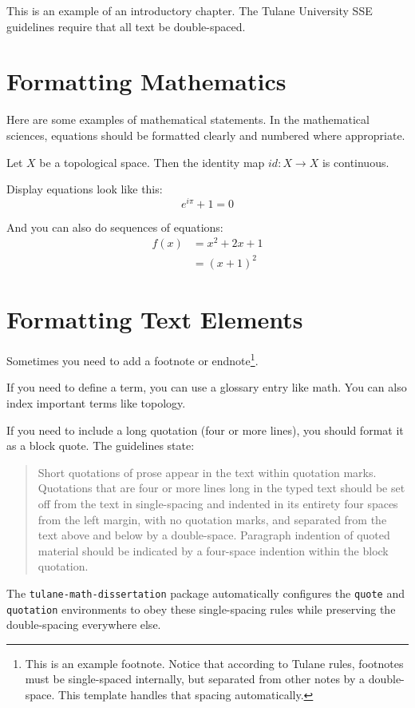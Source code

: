 This is an example of an introductory chapter. The Tulane University SSE guidelines require that all text be double-spaced.

\section{Formatting Mathematics}

Here are some examples of mathematical statements. In the mathematical sciences, equations should be formatted clearly and numbered where appropriate. 

\begin{theorem}
Let $X$ be a topological space. Then the identity map $id: X \to X$ is continuous.
\end{theorem}

Display equations look like this:
\begin{equation}
    e^{i\pi} + 1 = 0
\end{equation}

And you can also do sequences of equations:
\begin{align}
    f(x) &= x^2 + 2x + 1 \\
         &= (x + 1)^2
\end{align}

\section{Formatting Text Elements}

Sometimes you need to add a footnote or endnote\footnote{This is an example footnote. Notice that according to Tulane rules, footnotes must be single-spaced internally, but separated from other notes by a double-space. This template handles that spacing automatically.}.

If you need to define a term, you can use a glossary entry like \gls{math}. You can also index important terms like topology.

If you need to include a long quotation (four or more lines), you should format it as a block quote. The guidelines state:
\begin{quote}
Short quotations of prose appear in the text within quotation marks. Quotations that are four or more lines long in the typed text should be set off from the text in single-spacing and indented in its entirety four spaces from the left margin, with no quotation marks, and separated from the text above and below by a double-space. Paragraph indention of quoted material should be indicated by a four-space indention within the block quotation.
\end{quote}
The {\tt tulane-math-dissertation} package automatically configures the {\tt quote} and {\tt quotation} environments to obey these single-spacing rules while preserving the double-spacing everywhere else.